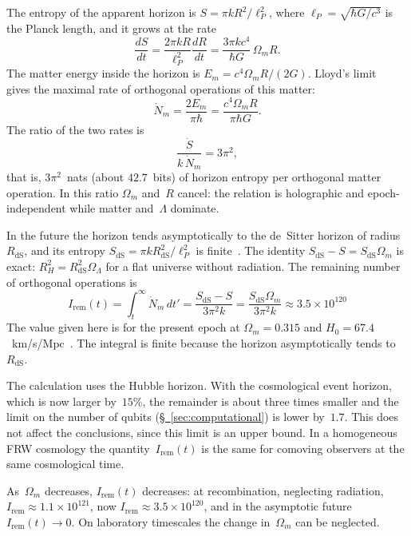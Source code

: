 \documentclass[11pt,a4paper]{article}
\newcommand{\Ost}{I_{\mathrm{rem}}}
\begin{document}
The entropy of the apparent horizon is $S=\pi k R^2/\ell_P^2$, where $\ell_P=\sqrt{\hbar G/c^3}$ is the Planck length, and it grows at the rate
\begin{equation}
\frac{dS}{dt}
= \frac{2\pi k R}{\ell_P^2}\frac{dR}{dt}
= \frac{3\pi k c^4}{\hbar G}\,\Omega_m R.
\end{equation}
The matter energy inside the horizon is $E_m=c^4\Omega_m R/(2G)$. Lloyd's limit~\cite{lloyd2000,lloyd2002} gives the maximal rate of orthogonal operations of this matter:
\begin{equation}
\dot N_m = \frac{2E_m}{\pi\hbar} = \frac{c^4\Omega_m R}{\pi\hbar G}.
\end{equation}
The ratio of the two rates is
\begin{equation}
\frac{\dot S}{k\,\dot N_m} = 3\pi^2,
\end{equation}
that is, $3\pi^2$~nats (about $42.7$~bits) of horizon entropy per orthogonal matter operation. In this ratio $\Omega_m$ and~$R$ cancel: the relation is holographic and epoch-independent while matter and~$\Lambda$ dominate.

In the future the horizon tends asymptotically to the de~Sitter horizon of radius~$R_{\mathrm{dS}}$, and its entropy $S_{\mathrm{dS}}=\pi k R_{\mathrm{dS}}^2/\ell_P^2$ is finite~\cite{gibbonshawking1977}. The identity $S_{\mathrm{dS}}-S=S_{\mathrm{dS}}\Omega_m$ is exact: $R_H^2=R_{\mathrm{dS}}^2\Omega_\Lambda$ for a flat universe without radiation. The remaining number of orthogonal operations is
\begin{equation}
\Ost(t)
= \int_t^\infty \dot N_m\,dt'
= \frac{S_{\mathrm{dS}}-S}{3\pi^2 k}
= \frac{S_{\mathrm{dS}}\Omega_m}{3\pi^2 k}
\approx 3.5\times 10^{120}
\end{equation}
The value given here is for the present epoch at $\Omega_m=0.315$ and $H_0=67.4$~km/s/Mpc~\cite{planck2020}. The integral is finite because the horizon asymptotically tends to~$R_{\mathrm{dS}}$.

The calculation uses the Hubble horizon. With the cosmological event horizon, which is now larger by~$15\%$, the remainder is about three times smaller and the limit on the number of qubits (\hyperref[sec:computational]{\S~\ref*{sec:computational}}) is lower by~$1.7$. This does not affect the conclusions, since this limit is an upper bound. In a homogeneous FRW cosmology the quantity~$\Ost(t)$ is the same for comoving observers at the same cosmological time.

As~$\Omega_m$ decreases, $\Ost(t)$ decreases: at recombination, neglecting radiation, $\Ost\approx 1.1\times 10^{121}$, now $\Ost\approx 3.5\times 10^{120}$, and in the asymptotic future $\Ost(t)\to 0$. On laboratory timescales the change in~$\Omega_m$ can be neglected.
\end{document}

